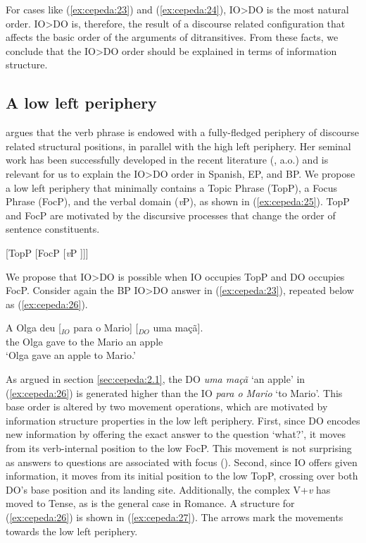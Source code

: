 \documentclass[output=paper,colorlinks,citecolor=brown]{./langscibook}
\begin{document}
For cases like (\ref{ex:cepeda:23}) and (\ref{ex:cepeda:24}), IO>DO is the most natural order. IO>DO is, therefore, the result of a discourse related configuration that affects the basic order of the arguments of ditransitives. From these facts, we conclude that the IO>DO order should be explained in terms of information structure.

\subsection{A low left periphery}\label{sec:cepeda:3.2}

\citet{Belletti2004Chapter} argues that the verb phrase is endowed with a fully-fledged periphery of discourse related structural positions, in parallel with the high left periphery. Her seminal work has been successfully developed in the recent literature (\citealt{Mioto2003, Quarezemin2005, Jiménez-Fernández2009}, a.o.) and is relevant for us to explain the IO>DO order in Spanish, EP, and BP. We propose a low left periphery that minimally contains a Topic Phrase (TopP), a Focus Phrase (FocP), and the verbal domain (\textit{v}P), as shown in (\ref{ex:cepeda:25}). TopP and FocP are motivated by the discursive processes that change the order of sentence constituents.

\ea%
    \label{ex:cepeda:25}
	[TopP [FocP [\textit{v}P ]]]
\z

We propose that IO>DO is possible when IO occupies TopP and DO occupies FocP. Consider again the BP IO>DO answer in (\ref{ex:cepeda:23}), repeated below as (\ref{ex:cepeda:26}).

\ea%
    \label{ex:cepeda:26}
	\gll A   Olga deu [$_{IO}$ para o   Mario] [$_{DO}$ uma maçã].\\
		the Olga gave \hspaceThis{[$_{IO}$} to the Mario  \hspaceThis{[$_{DO}$} an apple\\
	\glt ‘Olga gave an apple to Mario.’
\z

As argued in section \ref{sec:cepeda:2.1}, the DO \textit{uma maçã} ‘an apple’ in (\ref{ex:cepeda:26}) is generated higher than the IO \textit{para o Mario} ‘to Mario’. This base order is altered by two movement operations, which are motivated by information structure properties in the low left periphery. First, since DO encodes new information by offering the exact answer to the question ‘what?’, it moves from its verb-internal position to the low FocP. This movement is not surprising as answers to questions are associated with focus (\citealt{Rooth1992}). Second, since IO offers given information, it moves from its initial position to the low TopP, crossing over both DO’s base position and its landing site. Additionally, the complex V+\textit{v} has moved to Tense, as is the general case in Romance. A structure for (\ref{ex:cepeda:26}) is shown in (\ref{ex:cepeda:27}). The arrows mark the movements towards the low left periphery.
\end{document}
